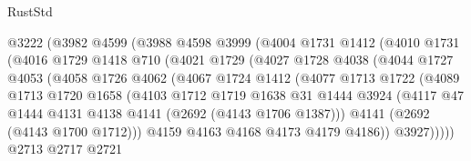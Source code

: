 \begin{lexlean}{RustStd}
\begin{coremodule}
{\begin{coremodule}
{{{{{{{{{{                  @3222
                  (@3982
                    @4599
                    (@3988
                      @4598
                      @3999
                      (@4004
                        @1731
                        @1412
                        (@4010
                          @1731
                          (@4016
                            @1729
                            @1418
                            @710
                            (@4021
                              @1729
                              (@4027
                                @1728
                                @4038
                                (@4044
                                  @1727
                                  @4053
                                  (@4058
                                    @1726
                                    @4062
                                    (@4067
                                      @1724
                                      @1412
                                      (@4077
                                        @1713
                                        @1722
                                        (@4089
                                          @1713
                                          @1720
                                          @1658
                                          (@4103
                                            @1712
                                            @1719
                                            @1638
                                            @31
                                            @1444
                                            @3924
                                            (@4117
                                              @47
                                              @1444
                                              @4131
                                              @4138
                                              @4141
                                              (@2692 (@4143 @1706 @1387)))
                                            @4141
                                            (@2692 (@4143 @1700 @1712)))
                                          @4159
                                          @4163
                                          @4168
                                          @4173
                                          @4179
                                          @4186))
                                      @3927)))))
                            @2713
                            @2717
                            @2721
}}}}}}}}}}
\end{coremodule}}
\end{coremodule}
\end{lexlean}

